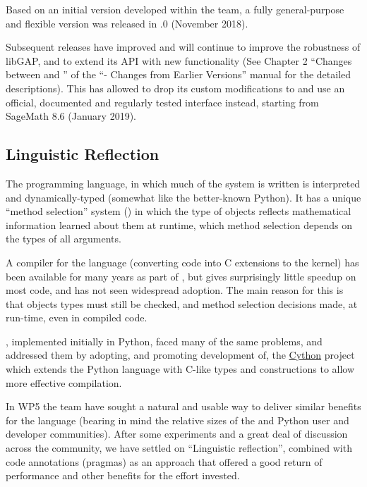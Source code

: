 \documentclass{deliverablereport}
\begin{document}
Based on an initial version developed within the \Sage team, a fully
general-purpose and flexible version was released in .0
(November 2018).

Subsequent releases have improved and will continue to improve the
robustness of libGAP, and to extend its API with new functionality (See Chapter 2 
``Changes between  and '' of the 
``\GAP - Changes from Earlier Versions'' manual for the detailed
descriptions). This has allowed \Sage to drop its custom 
modifications to \GAP and use an official, documented and regularly 
tested \GAP interface instead, starting from SageMath 8.6 (January
2019).


\subsection{Linguistic Reflection}\label{syntaxtree}
The \GAP programming language, in which much of the system is written
is interpreted and dynamically-typed (somewhat like the better-known
Python). It has a unique ``method selection'' system
(\cite{BreuerLinton98}) in which the type of objects reflects
mathematical information learned about them at runtime, which method
selection depends on the types of all arguments.

A compiler for the language (converting \GAP code
into C extensions to the \GAP kernel) has been available for many
years as part of \GAP, but gives surprisingly little speedup on most code, and has not
seen widespread adoption. The main reason for this is that objects
types must still be checked, and method selection decisions made, at
run-time, even in compiled code.

\Sage, implemented initially in Python, faced many of the same
problems, and addressed them by adopting, and promoting
development of, the \href{http://cython.org}{Cython} project which
extends the Python language with C-like types and constructions to
allow more effective compilation.

In WP5 the \GAP team have sought a natural and usable way to deliver
similar benefits for the \GAP language (bearing in mind the relative
sizes of the \GAP and Python user and developer communities). After
some experiments and a great deal of discussion across the community,
we have settled on ``Linguistic reflection'', combined with code
annotations (pragmas) as an approach that offered a good return of
performance and other benefits for the effort invested.
\end{document}
